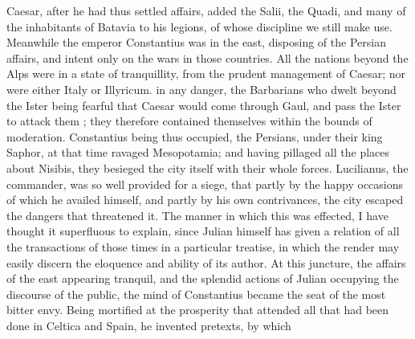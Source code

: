 Caesar, after he had thus settled affairs, added the Salii, the Quadi, and many of the inhabitants of Batavia to his legions, of whose discipline we still make use. Meanwhile the emperor Constantius was in the east, disposing of the Persian affairs, and intent only on the wars in those countries. All the nations beyond the Alps were in a state of tranquillity, from the prudent management of Caesar; nor were either Italy or Illyricum. in any danger, the Barbarians who dwelt beyond the Ister being fearful that Caesar would come through Gaul, and pass the Ister to attack them ; they therefore contained themselves within the bounds of moderation. Constantius being thus occupied, the Persians, under their king Saphor, at that time ravaged Mesopotamia; and having pillaged all the places about Nisibis, they besieged the city itself with their whole forces. Lucilianus, the commander, was so well provided for a siege, that partly by the happy occasions of which he availed himself, and partly by his own contrivances, the city escaped the dangers that threatened it. The manner in which this was effected, I have thought it superfluous to explain, since Julian himself has given a relation of all the transactions of those times in a particular treatise, in which the render may easily discern the eloquence and ability of its author. At this juncture, the affairs of the east appearing tranquil, and the splendid actions of Julian occupying the discourse of the public, the mind of Constantius became the seat of the most bitter envy. Being mortified at the prosperity that attended all that had been done in Celtica and Spain, he invented pretexts, by which
